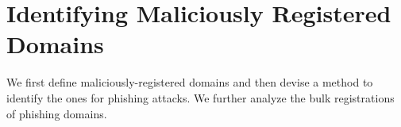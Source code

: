 \vspace{-3px}
\section{Identifying Maliciously Registered Domains}
\label{sec:def_mal_registered_domains}
We first define maliciously-registered domains and then devise a method to identify the ones
for phishing attacks.
We further analyze the bulk registrations of phishing domains.


